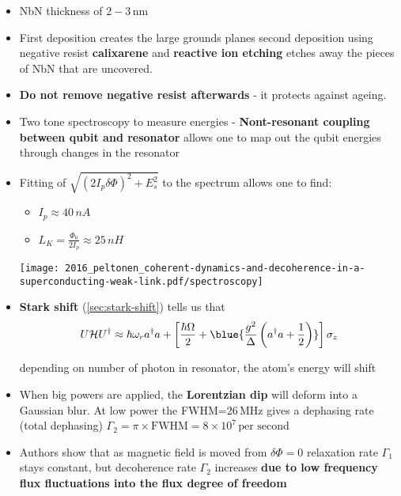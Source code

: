   \begin{framed}\noindent
    \begin{itemize}
    \item NbN thickness of $2-3\,\text{nm}$
    \item  First  deposition  creates  the  large  grounds  planes  \ira  second
      deposition using negative  resist \textbf{calixarene} and \textbf{reactive
        ion etching} etches away the pieces of NbN that are uncovered.
    \item  \textbf{Do  not remove  negative  resist  afterwards} -  it  protects
      against ageing.
    \item  Two tone  spectroscopy  to measure  energies -  \textbf{Nont-resonant
        coupling between  qubit and resonator} allows  one to map out  the qubit
      energies through changes in the resonator
    \item Fitting  of $\sqrt{\left(  2I_p\delta\Phi \right)^2  + E_s^2}$  to the
      spectrum allows one to find:
      \begin{itemize}
      \item $I_{p} \approx 40\,nA$
      \item $L_K = \frac{\Phi_0}{2I_{p}} \approx 25\,nH$
      \end{itemize}
      \begin{center}
        \texttt{[image: 2016\_peltonen\_coherent-dynamics-and-decoherence-in-a-superconducting-weak-link.pdf/spectroscopy]}
      \end{center}

    \item \textbf{Stark shift} (\autoref{sec:stark-shift}) tells us that
      \begin{equation}
        U\mathcal{H}U^{\dagger} \approx \hbar\omega_ra^{\dag}a + \left[\frac{\hbar\Omega}{2} + \blue{\frac{g^{2}}{\Delta}\left( a^{\dagger}a + \frac{1}{2} \right)} \right]\sigma_z
      \end{equation}

      \noindent depending  on number of  photon in resonator, the  atom's energy
      will shift
    \item When big  powers are applied, the \textbf{Lorentzian  dip} will deform
      into a Gaussian blur. At low power the FWHM=26\,MHz gives a dephasing rate
      (total                                                          dephasing)
      $\Gamma_2 = \pi \times \text{FWHM} = 8\times10^{7}\,\text{per second}$
    \item Authors  show that as  magnetic field is  moved from $\delta\Phi  = 0$
      relaxation rate $\Gamma_1$ stays constant, but decoherence rate $\Gamma_2$
      increases \textbf{due  to low  frequency flux  fluctuations into  the flux
        degree of freedom}
    \end{itemize}
  \end{framed}


